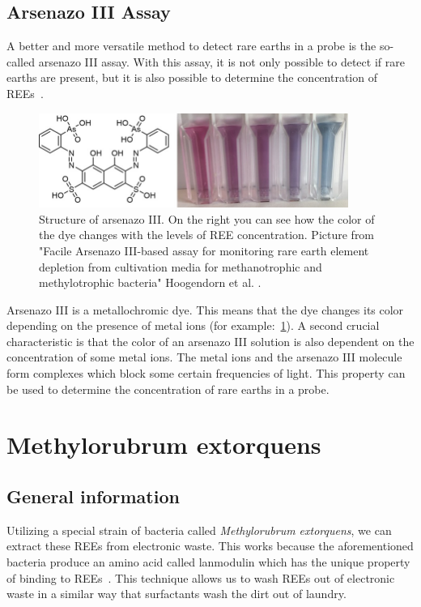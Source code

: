 \subsection{Arsenazo III Assay}
A better and more versatile method to detect rare earths in a probe is the so-called arsenazo III assay.
With this assay, it is not only possible to detect if rare earths are present, but it is also possible to determine the concentration of REEs~\cite{arsenazo3assay}.

\begin{figure}[H]
    \centering
    \includegraphics[width=0.9\textwidth]{media/images/arsenazo3_structure_example}
    \caption{Structure of arsenazo III. On the right you can see how the color of the dye changes with the levels of REE concentration. Picture from "Facile Arsenazo III-based assay for monitoring rare earth element depletion from cultivation media for methanotrophic and methylotrophic bacteria" Hoogendorn et al. \cite{arsenazo3assay}.}
    \label{fig:arsenazo3}
\end{figure}

Arsenazo III is a metallochromic dye.
This means that the dye changes its color depending on the presence of metal ions (for example:~\ref{fig:arsenazo3}).
A second crucial characteristic is that the color of an arsenazo III solution is also dependent on the concentration of some metal ions.
The metal ions and the arsenazo III molecule form complexes which block some certain frequencies of light.
This property can be used to determine the concentration of rare earths in a probe.

\newpage

\section{Methylorubrum extorquens}

\subsection{General information\authorB{}}

Utilizing a special strain of bacteria called \emph{Methylorubrum extorquens}, we can extract these REEs from electronic waste.
This works because the aforementioned bacteria produce an amino acid called lanmodulin which has the unique property of binding to REEs~\cite{lanmdiscovery}.
This technique allows us to wash REEs out of electronic waste in a similar way that
surfactants wash the dirt out of laundry.

